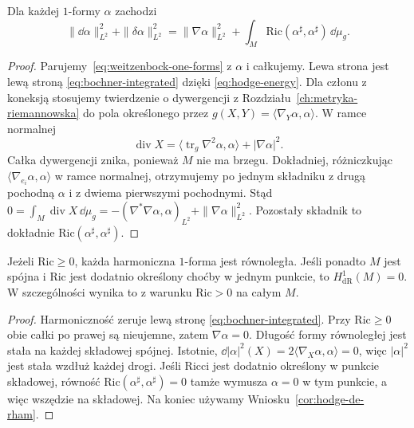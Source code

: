 \begin{stwierdzenie}
\label{prop:bochner-integrated}
Dla każdej $1$-formy $\alpha$ zachodzi
\begin{equation}\label{eq:bochner-integrated}
 \|\dd\alpha\|_{L^2}^2+\|\delta\alpha\|_{L^2}^2
 =\|\nabla\alpha\|_{L^2}^2
  +\int_M\mathrm{Ric}(\alpha^\sharp,\alpha^\sharp)
                       \,\dd\mu_g.
\end{equation}
\end{stwierdzenie}
\begin{proof}
Parujemy~\eqref{eq:weitzenbock-one-forms} z $\alpha$
i całkujemy. Lewa strona jest lewą stroną
\eqref{eq:bochner-integrated} dzięki
\eqref{eq:hodge-energy}. Dla członu z koneksją
stosujemy twierdzenie o dywergencji z
Rozdziału~\ref{ch:metryka-riemannowska} do pola
określonego przez $g(X,Y)=\langle\nabla_Y\alpha,\alpha\rangle$.
W ramce normalnej
\[
 \operatorname{div}X
 =\langle\operatorname{tr}_g\nabla^2\alpha,\alpha\rangle
  +|\nabla\alpha|^2.
\]
Całka dywergencji znika, ponieważ $M$ nie ma brzegu.
Dokładniej, różniczkując
$\langle\nabla_{e_i}\alpha,\alpha\rangle$
w ramce normalnej, otrzymujemy po jednym składniku
z drugą pochodną $\alpha$ i z dwiema pierwszymi pochodnymi.
Stąd
$0=\int_M\operatorname{div}X\,\dd\mu_g
=-(\nabla^*\nabla\alpha,\alpha)_{L^2}
+\|\nabla\alpha\|_{L^2}^2$.
Pozostały składnik to dokładnie
$\mathrm{Ric}(\alpha^\sharp,\alpha^\sharp)$.
\end{proof}

\begin{wniosek}
\label{cor:bochner-vanishing}
Jeżeli $\mathrm{Ric}\geq0$, każda harmoniczna $1$-forma
jest równoległa. Jeśli ponadto $M$ jest spójna i
$\mathrm{Ric}$ jest dodatnio określony choćby w jednym
punkcie, to $H^1_{\mathrm{dR}}(M)=0$.
W szczególności wynika to z warunku $\mathrm{Ric}>0$
na całym $M$.
\end{wniosek}
\begin{proof}
Harmoniczność zeruje lewą stronę
\eqref{eq:bochner-integrated}. Przy $\mathrm{Ric}\geq0$
obie całki po prawej są nieujemne, zatem
$\nabla\alpha=0$. Długość formy równoległej jest
stała na każdej składowej spójnej.
Istotnie, $\dd|\alpha|^2(X)=2\langle\nabla_X\alpha,\alpha\rangle=0$,
więc $|\alpha|^2$ jest stała wzdłuż każdej drogi.
Jeśli Ricci jest
dodatnio określony w punkcie składowej, równość
$\mathrm{Ric}(\alpha^\sharp,\alpha^\sharp)=0$ tamże
wymusza $\alpha=0$ w tym punkcie, a więc wszędzie
na składowej. Na koniec używamy
Wniosku~\ref{cor:hodge-de-rham}.
\end{proof}

